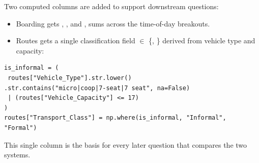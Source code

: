 Two computed columns are added to support downstream questions:

\begin{itemize}
 \item Boarding gets ,
 , and 
, sums across the time-of-day breakouts.
 \item Routes gets a single classification field
  $\in$ \{, \}
 derived from vehicle type and capacity:
\end{itemize}

\begin{lstlisting}[caption={Formal/Informal classification on Routes.}]
is_informal = (
 routes["Vehicle_Type"].str.lower()
.str.contains("micro|coop|7-seat|7 seat", na=False)
 | (routes["Vehicle_Capacity"] <= 17)
)
routes["Transport_Class"] = np.where(is_informal, "Informal", "Formal")
\end{lstlisting}

This single column is the basis for every later question that compares
the two systems.

